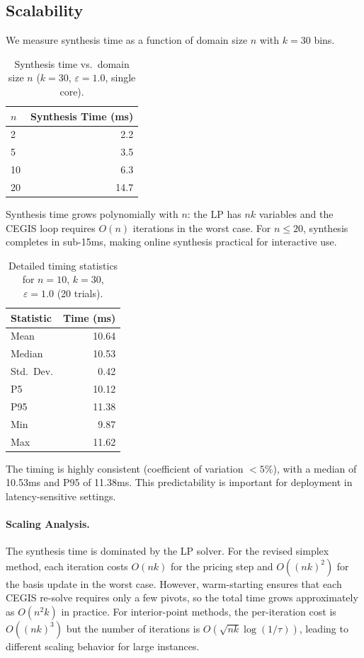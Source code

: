 \documentclass[11pt,a4paper]{article}
\newcommand{\eps}{\varepsilon}
\begin{document}
\subsection{Scalability}
\label{subsec:scalability}

We measure synthesis time as a function of domain size $n$ with $k = 30$ bins.

\begin{table}[t]
\centering
\caption{Synthesis time vs.\ domain size $n$ ($k = 30$, $\eps = 1.0$, single core).}
\label{tab:scalability}
\begin{tabular}{@{}lr@{}}
\toprule
$n$ & Synthesis Time (ms) \\
\midrule
2   & 2.2 \\
5   & 3.5 \\
10  & 6.3 \\
20  & 14.7 \\
\bottomrule
\end{tabular}
\end{table}

Synthesis time grows polynomially with $n$: the LP has $nk$ variables and the
CEGIS loop requires $O(n)$ iterations in the worst case.  For $n \le 20$,
synthesis completes in sub-15ms, making online synthesis practical for
interactive use.

\begin{table}[t]
\centering
\caption{Detailed timing statistics for $n = 10$, $k = 30$, $\eps = 1.0$ (20 trials).}
\label{tab:timing}
\begin{tabular}{@{}lr@{}}
\toprule
Statistic & Time (ms) \\
\midrule
Mean     & 10.64 \\
Median   & 10.53 \\
Std.\ Dev. & 0.42 \\
P5       & 10.12 \\
P95      & 11.38 \\
Min      & 9.87 \\
Max      & 11.62 \\
\bottomrule
\end{tabular}
\end{table}

The timing is highly consistent (coefficient of variation $< 5\%$), with a
median of 10.53ms and P95 of 11.38ms.  This predictability is important for
deployment in latency-sensitive settings.

\paragraph{Scaling Analysis.}
The synthesis time is dominated by the LP solver.  For the revised simplex
method, each iteration costs $O(nk)$ for the pricing step and $O((nk)^2)$
for the basis update in the worst case.  However, warm-starting ensures that
each CEGIS re-solve requires only a few pivots, so the total time grows
approximately as $O(n^2 k)$ in practice.  For interior-point methods, the
per-iteration cost is $O((nk)^3)$ but the number of iterations is
$O(\sqrt{nk} \log(1/\tau))$, leading to different scaling behavior for large
instances.
\end{document}
